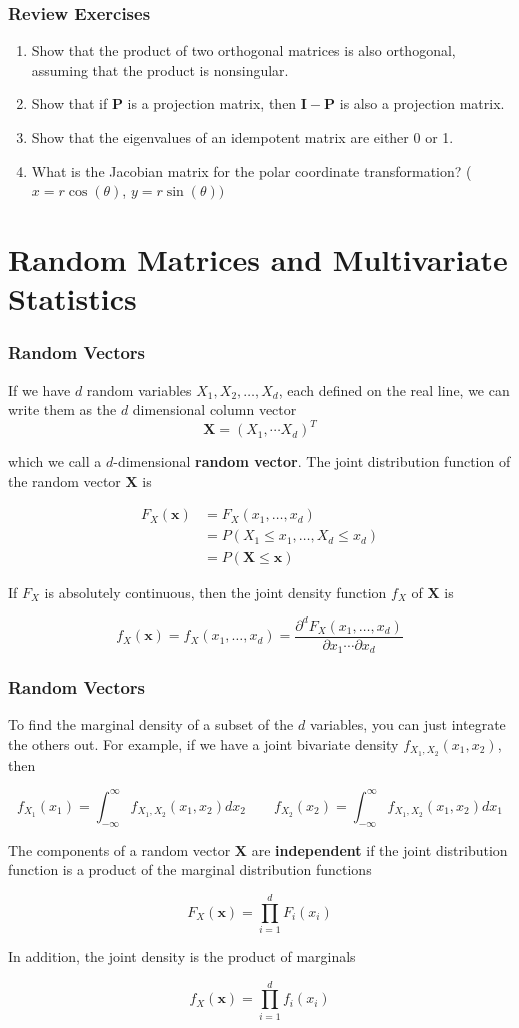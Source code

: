 \documentclass{beamer}
\begin{document}
\begin{frame}
\frametitle{Review Exercises}
\begin{enumerate}
\item Show that the product of two orthogonal matrices is also orthogonal, assuming that the product is nonsingular.

\item Show that if $\mathbf{P}$ is a projection matrix, then $\mathbf{I} - \mathbf{P}$ is also a projection matrix.

\item Show that the eigenvalues of an idempotent matrix are either 0 or 1.

\item What is the Jacobian matrix for the polar coordinate transformation? ($x = r \cos (\theta)$, $y = r \sin (\theta))$
\end{enumerate}
\end{frame}


\section{Random Matrices and Multivariate Statistics}
\begin{frame}
\frametitle{Random Vectors}
If we have $d$ random variables $X_1, X_2, \hdots, X_d$, each defined on the real line, we can write them as the $d$ dimensional column vector $$\mathbf{X} = (X_1, \cdots X_d)^T$$

which we call a $d$-dimensional \textbf{random vector}.  The joint distribution function of the random vector $\mathbf{X}$ is

\begin{align*}
F_X(\mathbf{x}) &= F_X(x_1, \hdots, x_d) \\
&= P(X_1 \leq x_1, \hdots, X_d \leq x_d)\\
&= P(\mathbf{X} \leq \mathbf{x})
\end{align*}

If $F_X$ is absolutely continuous, then the joint density function $f_X$ of $\mathbf{X}$ is

$$f_X(\mathbf{x}) = f_X(x_1, \hdots, x_d) = \frac{\partial ^d F_X(x_1, \hdots, x_d)}{\partial x_1 \cdots \partial x_d}$$
\end{frame}

\begin{frame}
\frametitle{Random Vectors}
To find the marginal density of a subset of the $d$ variables, you can just integrate the others out.  For example, if we have a joint bivariate density $f_{X_1,X_2}(x_1, x_2)$, then 

$$f_{X_1}(x_1) = \int_{-\infty}^{\infty} f_{X_1,X_2}(x_1, x_2) dx_2 \qquad f_{X_2}(x_2) = \int_{-\infty}^{\infty} f_{X_1,X_2}(x_1, x_2) dx_1$$

The components of a random vector $\mathbf{X}$ are \textbf{independent} if the joint distribution function is a product of the marginal distribution functions

$$F_X(\mathbf{x}) = \prod_{i=1}^d F_i(x_i)$$

In addition, the joint density is the product of marginals

$$f_X(\mathbf{x}) = \prod_{i=1}^d f_i(x_i)$$
\end{frame}
\end{document}
